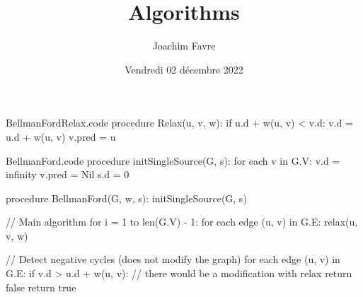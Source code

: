\documentclass[a4paper]{article}
\title{Algorithms}
\author{Joachim Favre}
\date{Vendredi 02 décembre 2022}
\begin{document}
\maketitle


\begin{filecontents*}[overwrite]{BellmanFordRelax.code}
procedure Relax(u, v, w):
    if u.d + w(u, v) < v.d:
        v.d = u.d + w(u, v)
        v.pred = u
\end{filecontents*}

\begin{filecontents*}[overwrite]{BellmanFord.code}
procedure initSingleSource(G, s):
    for each v in G.V:
        v.d = infinity
        v.pred = Nil
    s.d = 0

procedure BellmanFord(G, w, s):
    initSingleSource(G, s)

    // Main algorithm
    for i = 1 to len(G.V) - 1:
        for each edge (u, v) in G.E:
            relax(u, v, w)

    // Detect negative cycles (does not modify the graph)
    for each edge (u, v) in G.E:
        if v.d > u.d + w(u, v):  // there would be a modification with relax
            return false
    return true
\end{filecontents*}
\end{document}
